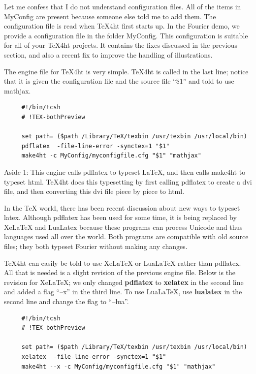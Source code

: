 \documentclass[11pt, oneside]{article}   	%
\begin{document}
Let me confess that I do not understand configuration files. All of the items in MyConfig are present because someone else told me to add them. The configuration file is read when TeX4ht first starts up. 
In the Fourier demo, we provide a configuration file in the folder MyConfig. This configuration is
suitable for all of your TeX4ht projects. It contains the fixes discussed in the previous section,
and also a recent fix to improve the handling of illustrations.

\newpage


The
engine file for TeX4ht is very simple. TeX4ht is called in the last line; notice that it is given
the configuration file and the source file ``\$1'' and told to use mathjax.
\begin{verbatim}
     #!/bin/tcsh
     # !TEX-bothPreview

     set path= ($path /Library/TeX/texbin /usr/texbin /usr/local/bin)
     pdflatex  -file-line-error -synctex=1 "$1"
     make4ht -c MyConfig/myconfigfile.cfg "$1" "mathjax"
\end{verbatim}

Aside 1: This engine calls pdflatex to typeset LaTeX, and then calls make4ht to typeset html.
TeX4ht does this typesetting by first calling pdflatex to create a dvi  file, and then converting this
dvi file piece by piece to html. 

In the TeX world, there has been recent discussion about
new ways to typeset latex. Although pdflatex has been used for some time, it is being replaced by
XeLaTeX and LuaLatex because these programs can process Unicode and thus languages used
all over the world. Both programs are  compatible with old source files; 
they both typeset Fourier without making any changes.  

TeX4ht can easily be told to use XeLaTeX or LuaLaTeX rather than pdflatex. All that is needed is a slight revision of the previous engine file. 
Below is the revision for XeLaTeX; we only changed {\bf pdflatex} to {\bf xelatex} in the second line
and added a flag ``--x'' in the third line. To use LuaLaTeX,  use {\bf lualatex} in the second line and
change the flag to ``--lua''.
\begin{verbatim}
     #!/bin/tcsh
     # !TEX-bothPreview

     set path= ($path /Library/TeX/texbin /usr/texbin /usr/local/bin)
     xelatex  -file-line-error -synctex=1 "$1"
     make4ht --x -c MyConfig/myconfigfile.cfg "$1" "mathjax"
\end{verbatim}
\end{document}
